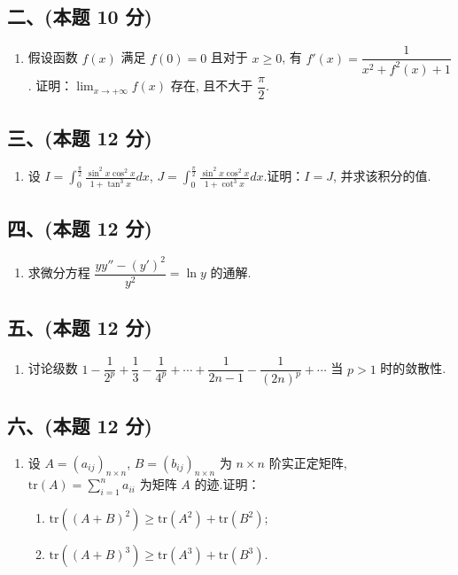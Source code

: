 \subsection*{二、(本题 10 分)}
\begin{enumerate}[start=6]
    \item 假设函数 $f(x)$ 满足 $f(0) = 0$ 且对于 $x \geqslant 0$, 有 $f'(x) = \dfrac{1}{x^2 + f^2(x) + 1}$.
          证明：$\displaystyle\lim_{x \to +\infty} f(x)$ 存在, 且不大于 $\dfrac{\pi}{2}$.
\end{enumerate}

\subsection*{三、(本题 12 分)}
\begin{enumerate}[start=7]
    \item 设 $I = \displaystyle\int_0^{\frac{\pi}{2}} \frac{\sin^2 x \cos^2 x}{1 + \tan^3 x} dx$, $J = \displaystyle\int_0^{\frac{\pi}{2}} \frac{\sin^2 x \cos^2 x}{1 + \cot^3 x} dx$.证明：$I = J$, 并求该积分的值.
\end{enumerate}

\subsection*{四、(本题 12 分)}
\begin{enumerate}[start=8]
    \item 求微分方程 $\dfrac{yy'' - (y')^2}{y^2} = \ln y$ 的通解.
\end{enumerate}

\subsection*{五、(本题 12 分)}
\begin{enumerate}[start=9]
    \item 讨论级数
          $1 - \dfrac{1}{2^p} + \dfrac{1}{3} - \dfrac{1}{4^p} + \cdots + \dfrac{1}{2n-1} - \dfrac{1}{(2n)^p} + \cdots$
          当 $p > 1$ 时的敛散性.
\end{enumerate}

\subsection*{六、(本题 12 分)}
\begin{enumerate}[start=10]
    \item 设 $A = (a_{ij})_{n \times n}$, $B = (b_{ij})_{n \times n}$ 为 $n \times n$ 阶实正定矩阵, $\text{tr}(A) = \displaystyle\sum_{i=1}^n a_{ii}$ 为矩阵 $A$ 的迹.证明：
          \begin{enumerate}
              \item[(1)] $\text{tr}((A+B)^2) \geqslant \text{tr}(A^2) + \text{tr}(B^2)$;
              \item[(2)] $\text{tr}((A+B)^3) \geqslant \text{tr}(A^3) + \text{tr}(B^3)$.
          \end{enumerate}
\end{enumerate}

